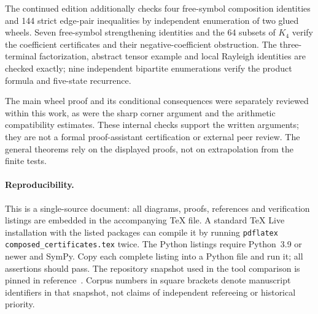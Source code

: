 \documentclass[11pt,a4paper]{article}
\theoremstyle{definition}
\theoremstyle{remark}\newtheorem{remark}[theorem]{Remark}
\begin{document}
The continued edition additionally checks four free-symbol composition
identities and 144 strict edge-pair inequalities by independent
enumeration of two glued wheels. Seven free-symbol strengthening
identities and the 64 subsets of $K_4$ verify the coefficient
certificates and their negative-coefficient obstruction. The
three-terminal factorization, abstract tensor example and local
Rayleigh identities are checked exactly; nine independent bipartite
enumerations verify the product formula and five-state recurrence.

The main wheel proof and its conditional consequences were separately
reviewed within this work, as were the sharp corner argument and the
arithmetic compatibility estimates. These internal checks support the
written arguments; they are not a formal proof-assistant certification
or external peer review. The general theorems rely on the displayed
proofs, not on extrapolation from the finite tests.

\paragraph{Reproducibility.}
This is a single-source document: all diagrams, proofs, references and
verification listings are embedded in the accompanying TeX file. A
standard TeX Live installation with the listed packages can compile it
by running \texttt{pdflatex composed\_certificates.tex} twice.
The Python listings require Python~3.9 or newer and SymPy. Copy each
complete listing into a Python file and run it; all assertions should pass.
The repository snapshot used in the tool comparison is pinned in
reference~\cite{VMRC}. Corpus numbers in square brackets denote
manuscript identifiers in that snapshot, not claims of independent
refereeing or historical priority.
\end{document}
